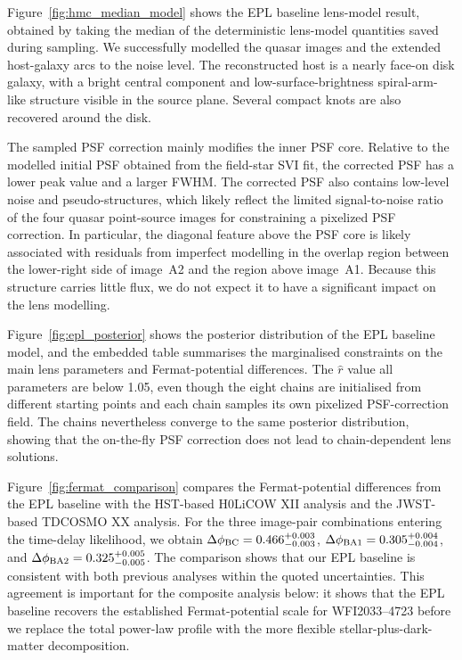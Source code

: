 \documentclass[fleqn,usenatbib]{mnras}
\begin{document}
Figure~\ref{fig:hmc_median_model} shows the EPL baseline lens-model result, obtained by taking the median of the deterministic lens-model quantities saved during sampling. We successfully modelled the quasar images and the extended host-galaxy arcs to the noise level. The reconstructed host is a nearly face-on disk galaxy, with a bright central component and low-surface-brightness spiral-arm-like structure visible in the source plane. Several compact knots are also recovered around the disk.

The sampled PSF correction mainly modifies the inner PSF core. Relative to the modelled initial PSF obtained from the field-star SVI fit, the corrected PSF has a lower peak value and a larger FWHM. The corrected PSF also contains low-level noise and pseudo-structures, which likely reflect the limited signal-to-noise ratio of the four quasar point-source images for constraining a pixelized PSF correction. In particular, the diagonal feature above the PSF core is likely associated with residuals from imperfect modelling in the overlap region between the lower-right side of image~A2 and the region above image~A1. Because this structure carries little flux, we do not expect it to have a significant impact on the lens modelling.

Figure~\ref{fig:epl_posterior} shows the posterior distribution of the EPL baseline model, and the embedded table summarises the marginalised constraints on the main lens parameters and Fermat-potential differences. The \(\hat r\) value all parameters are below 1.05, even though the eight chains are initialised from different starting points and each chain samples its own pixelized PSF-correction field. The chains nevertheless converge to the same posterior distribution, showing that the on-the-fly PSF correction does not lead to chain-dependent lens solutions. 

Figure~\ref{fig:fermat_comparison} compares the Fermat-potential differences from the EPL baseline with the HST-based H0LiCOW XII analysis and the JWST-based TDCOSMO XX analysis. For the three image-pair combinations entering the time-delay likelihood, we obtain \(\Delta\phi_{\rm BC}=0.466^{+0.003}_{-0.003}\), \(\Delta\phi_{\rm BA1}=0.305^{+0.004}_{-0.004}\), and \(\Delta\phi_{\rm BA2}=0.325^{+0.005}_{-0.005}\). The comparison shows that our EPL baseline is consistent with both previous analyses within the quoted uncertainties. This agreement is important for the composite analysis below: it shows that the EPL baseline recovers the established Fermat-potential scale for WFI2033--4723 before we replace the total power-law profile with the more flexible stellar-plus-dark-matter decomposition.
\end{document}

